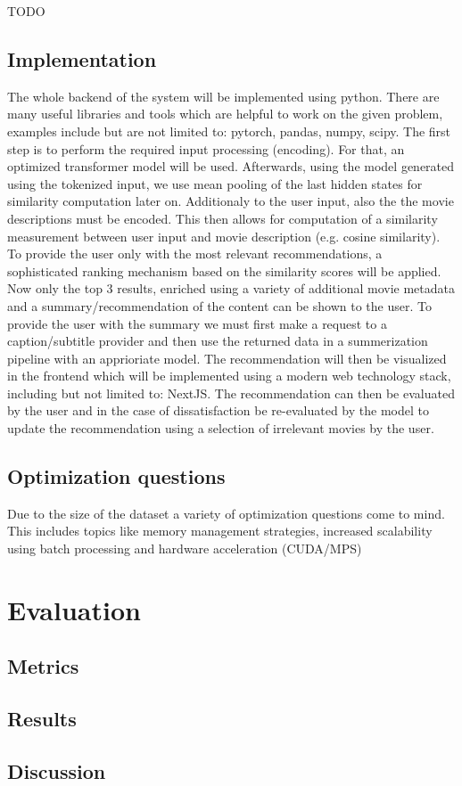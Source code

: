 \documentclass[12pt,a4paper]{article}
\begin{document}
  TODO

  \subsection{Implementation}

  The whole backend of the system will be implemented using python.
  There are many useful libraries and tools which are helpful to work on the given problem, examples include but are not limited to: pytorch, pandas, numpy, scipy.
  The first step is to perform the required input processing (encoding).
  For that, an optimized transformer model will be used.
  Afterwards, using the model generated using the tokenized input, we use mean pooling of the last hidden states for similarity computation later on.
  Additionaly to the user input, also the the movie descriptions must be encoded.
  This then allows for computation of a similarity measurement between user input and movie description (e.g. cosine similarity).
  To provide the user only with the most relevant recommendations, a sophisticated ranking mechanism based on the similarity scores will be applied.
  Now only the top 3 results, enriched using a variety of additional movie metadata and a summary/recommendation of the content can be shown to the user.
  To provide the user with the summary we must first make a request to a caption/subtitle provider and then use the returned data in a summerization pipeline with an apprioriate model.
  The recommendation will then be visualized in the frontend which will be implemented using a modern web technology stack, including but not limited to: NextJS.
  The recommendation can then be evaluated by the user and in the case of dissatisfaction be re-evaluated by the model to update the recommendation using a selection of irrelevant movies by the user.

  \subsection{Optimization questions}
  Due to the size of the dataset a variety of optimization questions come to mind.
  This includes topics like memory management strategies, increased scalability using batch processing and hardware acceleration (CUDA/MPS)

  \section{Evaluation}
  \subsection{Metrics}

  \subsection{Results}

  \subsection{Discussion}
\end{document}
